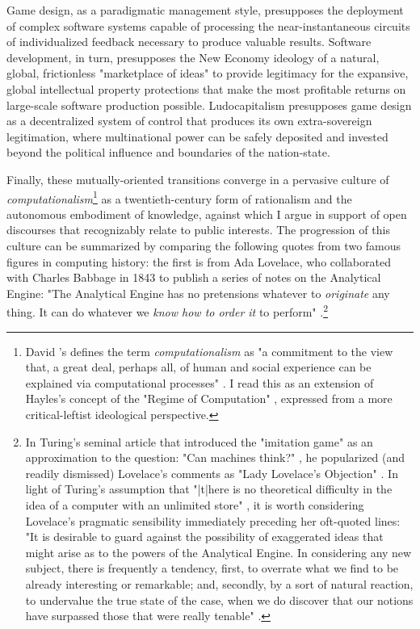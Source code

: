 Game design, as a paradigmatic management style, presupposes the deployment of complex software systems capable of processing the near-instantaneous circuits of individualized feedback necessary to produce valuable results. Software development, in turn, presupposes the New Economy ideology of a natural, global, frictionless "marketplace of ideas" to provide legitimacy for the expansive, global intellectual property protections that make the most profitable returns on large-scale software production possible. Ludocapitalism presupposes game design as a decentralized system of control that produces its own extra-sovereign legitimation, where multinational power can be safely deposited and invested beyond the political influence and boundaries of the nation-state.

Finally, these mutually-oriented transitions converge in a pervasive culture of \emph{computationalism}\footnote{
  David \citeauthor{Golumbia2009}'s  defines the term \emph{computationalism} as "a commitment to the view that, a great deal, perhaps all, of human and social experience can be explained via computational processes" \autocite[8]{Golumbia2009}. I read this as an extension of Hayles's concept of the "Regime of Computation" \autocite*[ch.~1]{Hayles2005-ss}, expressed from a more critical-leftist ideological perspective.
} as a twentieth-century form of rationalism and the autonomous embodiment of knowledge, against which I argue in support of open discourses that recognizably relate to public interests. The progression of this culture can be summarized by comparing the following quotes from two famous figures in computing history: the first is from Ada Lovelace, who collaborated with Charles Babbage in 1843 to publish a series of notes on the Analytical Engine: "The Analytical Engine has no pretensions whatever to \emph{originate} any thing. It can do whatever we \emph{know how to order it} to perform" \autocite*[722]{Lovelace1843-yi}.\footnote{
  In Turing's seminal article  that introduced the "imitation game" as an approximation to the question: "Can machines think?" \autocite[442]{Turing1950-qu}, he popularized (and readily dismissed) Lovelace's comments as "Lady Lovelace's Objection" \autocite[450]{Turing1950-qu}. In light of Turing's assumption that "|t|here is no theoretical difficulty in the idea of a computer with an unlimited store" \autocite[438]{Turing1950-qu}, it is worth considering Lovelace's pragmatic sensibility immediately preceding her oft-quoted lines: "It is desirable to guard against the possibility of exaggerated ideas that might arise as to the powers of the Analytical Engine. In considering any new subject, there is frequently a tendency, first, to overrate what we find to be already interesting or remarkable; and, secondly, by a sort of natural reaction, to undervalue the true state of the case, when we do discover that our notions have surpassed those that were really tenable" \autocite*[722]{Lovelace1843-yi}.
}
